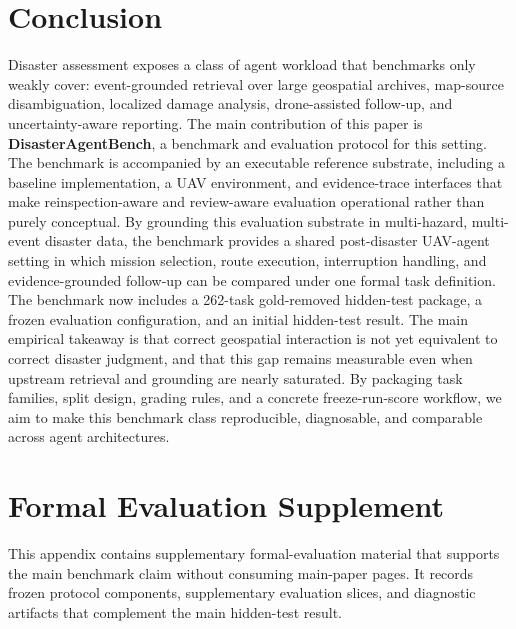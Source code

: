 \documentclass{article}
\begin{document}
\section{Conclusion}

Disaster assessment exposes a class of agent workload that benchmarks only weakly cover: event-grounded retrieval over large geospatial archives, map-source disambiguation, localized damage analysis, drone-assisted follow-up, and uncertainty-aware reporting. The main contribution of this paper is \textbf{DisasterAgentBench}, a benchmark and evaluation protocol for this setting. The benchmark is accompanied by an executable reference substrate, including a baseline implementation, a UAV environment, and evidence-trace interfaces that make reinspection-aware and review-aware evaluation operational rather than purely conceptual. By grounding this evaluation substrate in multi-hazard, multi-event disaster data, the benchmark provides a shared post-disaster UAV-agent setting in which mission selection, route execution, interruption handling, and evidence-grounded follow-up can be compared under one formal task definition. The benchmark now includes a 262-task gold-removed hidden-test package, a frozen evaluation configuration, and an initial hidden-test result. The main empirical takeaway is that correct geospatial interaction is not yet equivalent to correct disaster judgment, and that this gap remains measurable even when upstream retrieval and grounding are nearly saturated. By packaging task families, split design, grading rules, and a concrete freeze-run-score workflow, we aim to make this benchmark class reproducible, diagnosable, and comparable across agent architectures.




\appendix

\section{Formal Evaluation Supplement}
\label{sec:appendix-benchmark-diagnostics}

This appendix contains supplementary formal-evaluation material that supports the main benchmark claim without consuming main-paper pages. It records frozen protocol components, supplementary evaluation slices, and diagnostic artifacts that complement the main hidden-test result.
\end{document}
